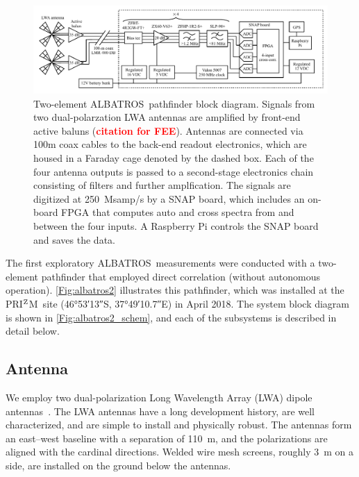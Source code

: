 \documentclass{ws-jai}
\def\albatros{ALBATROS}
\def\prizm{PRI$^{\rm Z}$M}
\newcommand{\attention}[1]{\textcolor{red}{\bf {#1}}}
\begin{document}
\begin{figure}
  \begin{center} \includegraphics[width=1.0\linewidth]{Figures/albatros_2elem_schematic/albatros_2elem_schematic.pdf}
    \caption{Two-element \albatros\ pathfinder block diagram.
      Signals from two dual-polarzation LWA antennas are amplified by
      front-end active baluns (\attention{citation for FEE}).
      Antennas are connected via 100m coax cables to the back-end 
      readout electronics, which are housed in a Faraday cage denoted
      by the dashed box.  Each of the four antenna outputs is passed
      to a second-stage electronics chain consisting of filters and further amplfication.  The signals are
      digitized at 250~Msamp/s by a SNAP board, which includes an on-board FPGA that computes auto and cross spectra
      from and between the four inputs.  A Raspberry Pi controls the SNAP board and
      saves the data.}
    \label{Fig:albatros2_schem}
  \end{center}
\end{figure}

The first exploratory \albatros\ measurements were conducted with a
two-element pathfinder that employed direct correlation (without
autonomous operation).  \autoref{Fig:albatros2} illustrates this
pathfinder, which was installed at the \prizm\ site (\ang{46;53;13}S,
\ang{37;49;10.7}E) in April 2018.  The system block diagram is shown
in \autoref{Fig:albatros2_schem}, and each of the subsystems is
described in detail below.

\subsection{Antenna}	
We employ two dual-polarization Long Wavelength Array (LWA) dipole
antennas~\citep{Memo28}.  The LWA antennas have a long development
history, are well characterized, and are simple to install and
physically robust.  The antennas form an east--west baseline with a
separation of \SI{110}{m}, and the polarizations are aligned with the
cardinal directions.  Welded wire mesh screens, roughly 3~m on a side,
are installed on the ground below the antennas.
\end{document}
